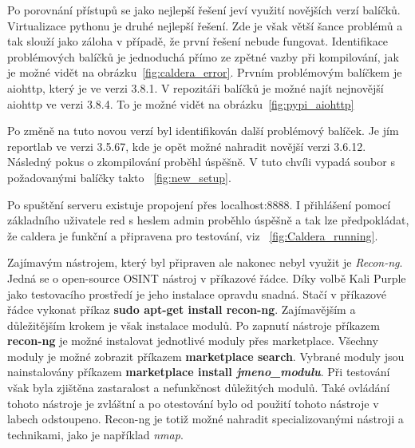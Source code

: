 Po porovnání přístupů se jako nejlepší řešení jeví využití novějších verzí balíčků.
Virtualizace pythonu je druhé nejlepší řešení.
Zde je však větší šance problémů a tak slouží jako záloha v případě, že první řešení nebude fungovat.
Identifikace problémových balíčků je jednoduchá přímo ze zpětné vazby při kompilování, jak je možné vidět na obrázku~\ref{fig:caldera_error}.
Prvním problémovým balíčkem je aiohttp, který je ve verzi 3.8.1.
V repozitáři balíčků je možné najít nejnovější aiohttp ve verzi 3.8.4.
To je možné vidět na obrázku~\ref{fig:pypi_aiohttp}

Po změně na tuto novou verzí byl identifikován další problémový balíček.
Je jím reportlab ve verzi 3.5.67, kde je opět možné nahradit novější verzi 3.6.12.
Následný pokus o zkompilování proběhl úspěšně.
V tuto chvíli vypadá soubor s požadovanými balíčky takto ~\ref{fig:new_setup}.

Po spuštění serveru existuje propojení přes localhost:8888.
I přihlášení pomocí základního uživatele red s heslem admin proběhlo úspěšně a tak lze předpokládat, že caldera je funkční a připravena pro testování, viz ~\ref{fig:Caldera_running}.

Zajímavým nástrojem, který byl připraven ale nakonec nebyl využit je \textit{Recon-ng}.
Jedná se o open-source \ac{OSINT} nástroj v příkazové řádce.
Díky volbě Kali Purple jako testovacího prostředí je jeho instalace opravdu snadná.
Stačí v příkazové řádce vykonat příkaz \textbf{sudo apt-get install recon-ng}.
Zajímavějším a důležitějším krokem je však instalace modulů.
Po zapnutí nástroje příkazem \textbf{recon-ng} je možné instalovat jednotlivé moduly přes marketplace.
Všechny moduly je možné zobrazit příkazem \textbf{marketplace search}.
Vybrané moduly jsou nainstalovány příkazem \textbf{marketplace install \textit{jmeno\_modulu}}.
Při testování však byla zjištěna zastaralost a nefunkčnost důležitých modulů.
Také ovládání tohoto nástroje je zvláštní a po otestování bylo od použití tohoto nástroje v labech odstoupeno.
Recon-ng je totiž možné nahradit specializovanými nástroji a technikami, jako je například \textit{nmap}.


